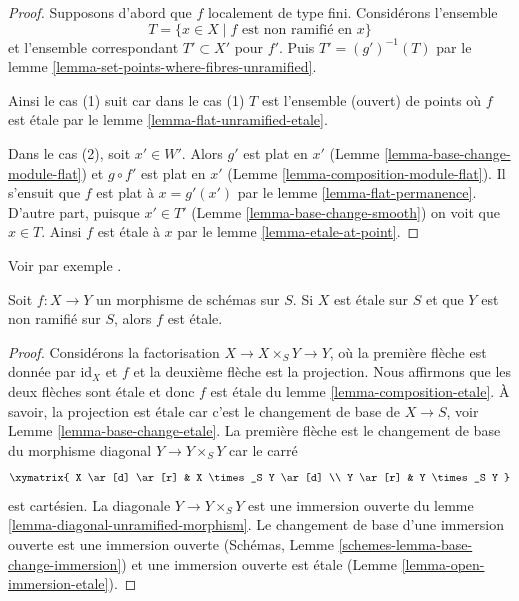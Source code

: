 \begin{proof}
Supposons d'abord que $f$ localement de type fini. Considérons l'ensemble
$$
T = \{x \in X \mid f\text{ est non ramifié en }x\}
$$
et l'ensemble correspondant $T' \subset X'$ pour
$f'$. Puis
$T' = (g')^{-1}(T)$ par le lemme \ref{lemma-set-points-where-fibres-unramified}.

\medskip\noindent Ainsi
le cas (1) suit car dans le cas (1) $T$ est l'ensemble (ouvert) de
points où $f$ est étale par le lemme \ref{lemma-flat-unramified-etale}.

\medskip\noindent
Dans le cas (2), soit $x' \in W'$. Alors $g'$
est plat en $x'$ (Lemme \ref{lemma-base-change-module-flat})
et $g \circ f'$ est plat en $x'$ (Lemme \ref{lemma-composition-module-flat}). Il s'ensuit
que $f$ est plat à $x = g'(x')$
par le lemme \ref{lemma-flat-permanence}. D'autre part, puisque $x' \in T'$
(Lemme \ref{lemma-base-change-smooth}) on voit que $x \in T$.
Ainsi $f$ est étale à $x$
par le lemme \ref{lemma-etale-at-point}.
\end{proof}

\begin{lemma}
\label{lemma-etale-permanence-better}
\begin{reference}
Voir par exemple \cite[Remarque 18.30 (2).]{GWII}.
\end{reference}
Soit $f : X \to Y$ un morphisme de schémas sur $S$. Si $X$ est étale
sur $S$ et que $Y$ est non ramifié sur $S$, alors $f$
est étale.
\end{lemma}

\begin{proof}
Considérons la factorisation $X \to X \times_S Y \to Y$, où la première flèche est donnée par
$\text{id}_X$ et $f$ et la deuxième flèche est la projection. Nous affirmons
que les deux flèches sont étale et donc $f$
est étale du lemme \ref{lemma-composition-etale}. À savoir, la projection est
étale car c'est le changement de base de $X \to S$, voir Lemme \ref{lemma-base-change-etale}.
La première flèche est le changement de base du morphisme
diagonal $Y \to Y \times_S Y$ car le carré
$$
\xymatrix{
X \ar[d] \ar[r] & X \times_S Y \ar[d] \\
Y \ar[r] & Y \times_S Y
}
$$
est cartésien. La diagonale $Y \to Y \times_S Y$ est une immersion ouverte
du lemme \ref{lemma-diagonal-unramified-morphism}. Le changement de base d'une
immersion ouverte est une immersion
ouverte (Schémas, Lemme \ref{schemes-lemma-base-change-immersion}) et une
immersion ouverte est étale
(Lemme \ref{lemma-open-immersion-etale}).
\end{proof}

